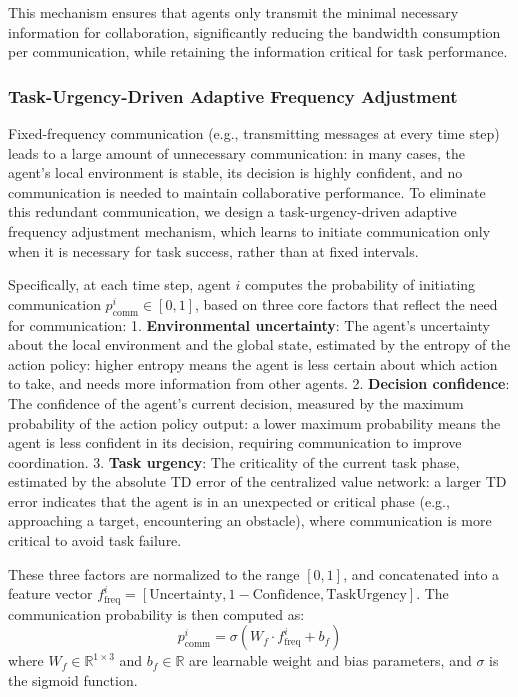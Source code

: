 \documentclass[10pt, twocolumn]{IEEEtran}
\begin{document}
This mechanism ensures that agents only transmit the minimal necessary information for collaboration, significantly reducing the bandwidth consumption per communication, while retaining the information critical for task performance.

\subsubsection{Task-Urgency-Driven Adaptive Frequency Adjustment}
Fixed-frequency communication (e.g., transmitting messages at every time step) leads to a large amount of unnecessary communication: in many cases, the agent's local environment is stable, its decision is highly confident, and no communication is needed to maintain collaborative performance. To eliminate this redundant communication, we design a task-urgency-driven adaptive frequency adjustment mechanism, which learns to initiate communication only when it is necessary for task success, rather than at fixed intervals.

Specifically, at each time step, agent $i$ computes the probability of initiating communication $p_{\text{comm}}^i \in [0, 1]$, based on three core factors that reflect the need for communication:
1. \textbf{Environmental uncertainty}: The agent's uncertainty about the local environment and the global state, estimated by the entropy of the action policy: higher entropy means the agent is less certain about which action to take, and needs more information from other agents.
2. \textbf{Decision confidence}: The confidence of the agent's current decision, measured by the maximum probability of the action policy output: a lower maximum probability means the agent is less confident in its decision, requiring communication to improve coordination.
3. \textbf{Task urgency}: The criticality of the current task phase, estimated by the absolute TD error of the centralized value network: a larger TD error indicates that the agent is in an unexpected or critical phase (e.g., approaching a target, encountering an obstacle), where communication is more critical to avoid task failure.

These three factors are normalized to the range $[0, 1]$, and concatenated into a feature vector $f_{\text{freq}}^i = [\text{Uncertainty}, 1-\text{Confidence}, \text{TaskUrgency}]$. The communication probability is then computed as:
\begin{equation}
p_{\text{comm}}^i = \sigma\left( W_f \cdot f_{\text{freq}}^i + b_f \right)
\end{equation}
where $W_f \in \mathbb{R}^{1 \times 3}$ and $b_f \in \mathbb{R}$ are learnable weight and bias parameters, and $\sigma$ is the sigmoid function.
\end{document}
